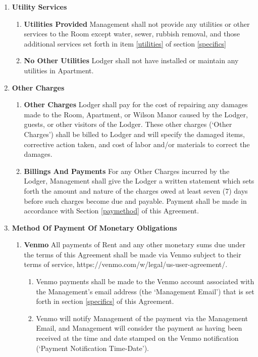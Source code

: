 \documentclass[12pt,letterpaper]{article}
\newcommand{\management}{Management}
\newcommand{\myemail}{Management Email}
\newcommand{\condo}{Wilson Manor}
\newcommand{\apt}{Apartment}
\newcommand{\room}{Room}
\newcommand{\lodger}{Lodger}
\newcommand{\paymenttime}{Payment Notification Time-Date}
\begin{document}
\begin{enumerate}
\begin{enumerate}
		\end{enumerate} 
	\item \textbf{Utility Services} \quad 
		\begin{enumerate} 
			\item \textbf{Utilities Provided} \quad \management{} shall not provide any utilities or other services to the \room{} except water, sewer, rubbish removal, and those additional services set forth in item \ref{utilities} of section \ref{specifics}
			\item \textbf{No Other Utilities} \quad \lodger{} shall not have installed or maintain any utilities in \apt{}.
		\end{enumerate} 
	\item \textbf{Other Charges} \quad 
		\begin{enumerate} 
			\item \textbf{Other Charges} \quad \lodger{} shall pay for the cost of repairing any damages made to the \room{}, \apt{}, or \condo{} caused by the \lodger{}, guests, or other visitors of the \lodger{}. These other charges (`Other Charges') shall be billed to \lodger{} and will specify the damaged items, corrective action taken, and cost of labor and/or materials to correct the damages. 
			\item \textbf{Billings And Payments} \quad For any Other Charges incurred by the \lodger{}, \management{} shall give the \lodger{} a written statement which sets forth the amount and nature of the charges owed at least seven (7) days before such charges become due and payable. Payment shall be made in accordance with Section \ref{paymethod} of this Agreement. 
		\end{enumerate} 
	\item \textbf{Method Of Payment Of Monetary Obligations} \quad \label{paymethod}
		\begin{enumerate} 
			\item \textbf{Venmo} \quad All payments of Rent and any other monetary sums due under the terms of this Agreement shall be made via Venmo subject to their terms of service, https://venmo.com/w/legal/us-user-agreement/. 
				\begin{enumerate}
					\item Venmo payments shall be made to the Venmo account associated with the \management{}'s email address (the `\myemail{}') that is set forth in section \ref{specifics} of this Agreement{}. 
					\item \label{defpaytime} 
						Venmo will notify \management{} of the payment via the \myemail{}, and \management{} will consider the payment as having been received at the time and date stamped on the Venmo notification (`\paymenttime{}'). 

\end{enumerate}
\end{enumerate}
\end{enumerate}
\end{document}
